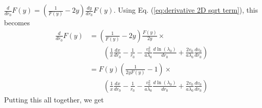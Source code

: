 \documentclass[aps,prl,twocolumn,showpacs,superscriptaddress,groupedaddress]{revtex4-1}  %
\begin{document}
 $\frac{d}{dr_0} F(y) = \left(\frac{1}{F(y)} - 2 y\right)  \frac{dy}{dr_0} F(y)$.  Using Eq. (\ref{eq:derivative 2D sqrt term}), this becomes 
\begin{align} 
  \frac{d}{dr_0} F\left(y\right) &= \left(\frac{1}{F(y)} - 2 y\right)\frac{F(y)}{2y} \times\nonumber\\
                                              &\quad\quad\left(\frac{1}{x} \frac{d x}{d r_0} - \frac{1}{r_0}  -  \frac{v_0^2}{a\lambda_0} \frac{d\ln(\lambda_0)}{d r_0} +   \frac{2 v_0}{a\lambda_0}\frac{d v_0}{d r_0}\right)\nonumber\\
                                              &=F(y) \left(\frac{1}{2 y F(y)} - 1\right)\times\nonumber\\
                                              &\quad\quad\left(\frac{1}{x} \frac{d x}{d r_0} - \frac{1}{r_0}  -  \frac{v_0^2}{a\lambda_0} \frac{d\ln(\lambda_0)}{d r_0} +   \frac{2 v_0}{a\lambda_0}\frac{d v_0}{d r_0}\right)\label{eq:derivative our Dawson} 
\end{align}
Putting this all together, we get
\end{document}
